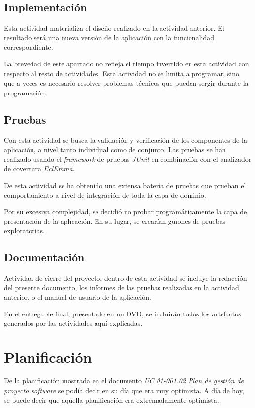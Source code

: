 \subsection*{Implementación}

Esta actividad materializa el diseño realizado en la actividad anterior. El
resultado será una nueva versión de la aplicación con la funcionalidad
correspondiente.

La brevedad de este apartado no refleja el tiempo invertido en esta actividad
con respecto al resto de actividades. Esta actividad no se limita a programar,
sino que a veces es necesario resolver problemas técnicos que pueden sergir
durante la programación.

\subsection*{Pruebas}

Con esta actividad se busca la validación y verificación de los componentes de
la aplicación, a nivel tanto individual como de conjunto. Las pruebas
se han realizado usando el \textit{framework} de pruebas \textit{JUnit} en
combinación con el analizador de covertura \textit{EclEmma}.

De esta actividad se ha obtenido una extensa batería de pruebas que prueban el
comportamiento a nivel de integración de toda la capa de dominio.

Por su excesiva complejidad, se decidió no probar programáticamente la capa de
presentación de la aplicación. En su lugar, se crearían guiones de pruebas
exploratorias.

\subsection*{Documentación}

Actividad de cierre del proyecto, dentro de esta actividad se incluye la
redacción del presente documento, los informes de las pruebas realizadas en la
actividad anterior, o el manual de usuario de la aplicación.

En el entregable final, presentado en un DVD, se incluirán todos los artefactos
generados por las actividades aquí explicadas.

\section{Planificación}

De la planificación mostrada en el documento \textit{UC 01-001.02 Plan de
gestión de proyecto software} se podía decir en su día que era muy optimista. A
día de hoy, se puede decir que aquella planificación era extremadamente
optimista.

